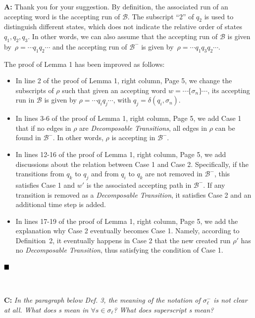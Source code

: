 \documentclass[10pt]{article}
\begin{document}
\textbf{A:} Thank you for your suggestion.
By definition, the associated run of an accepting word is the accepting run of $\mathcal{B}$.
The subscript ``$2$'' of $q_2$ is used to distinguish different states, which does not indicate the relative order of states $q_1,q_2,q_3$.
In other words,
we can also assume that the accepting run of $\mathcal{B}$ is given by~$\rho=\cdots q_1q_2\cdots$ and the accepting run of $\mathcal{B}^-$
is given by~$\rho=\cdots q_1q_3q_2\cdots$.

The proof of Lemma 1 has been improved as follows:
\begin{itemize}
\item In line 2 of the proof of Lemma 1, right column, Page 5, we change the subscripts of $\rho$ such that given an accepting word $w=\cdots\{\sigma_n\}\cdots$, its accepting
 run in $\mathcal{B}$ is given by {$\rho=\cdots q_{i}q_{j}\cdots$},
 with {$q_{j}=\delta(q_i,\sigma_n)$}.

\item In lines 3-6 of the proof of Lemma 1, right column, Page 5,  we add Case 1 that if no edges in $\rho$ are \emph{Decomposable Transitions}, all edges in $\rho$
can be found in $\mathcal{B}^-$. In other words, $\rho$ is accepting in $\mathcal{B}^-$.


\item In lines 12-16 of the proof of Lemma 1, right column, Page 5, we add discussions about the relation between Case 1 and Case 2. Specifically,
if the transitions from $q_k$ to $q_j$ and from $q_i$ to $q_k$
are not removed in $\mathcal{B}^-$, this satisfies Case 1 and $w'$ is the associated accepting path in $\mathcal{B}^-$.
 If any transition is removed as a \emph{Decomposable Transition}, it satisfies Case 2 and an additional time step is added.

\item In lines 17-19 of the proof of Lemma 1, right column, Page 5, we add the explanation why Case 2 eventually becomes Case 1.
  Namely, according to {Definition~2}, it eventually happens in Case 2 that the new created run $\rho'$ has no \emph{Decomposable Transition}, thus satisfying the condition of Case 1.
\end{itemize}
$\hfill\blacksquare$


\hspace*{\fill} \




\textbf{C:}
\emph{In the paragraph below Def. 3, the meaning of the notation of
	$\sigma_{\ell}^{-}$ is not clear at all. What does s mean in
	$\forall{s}\in{\sigma_{\ell}}$? What does superscript s mean?}
\end{document}
